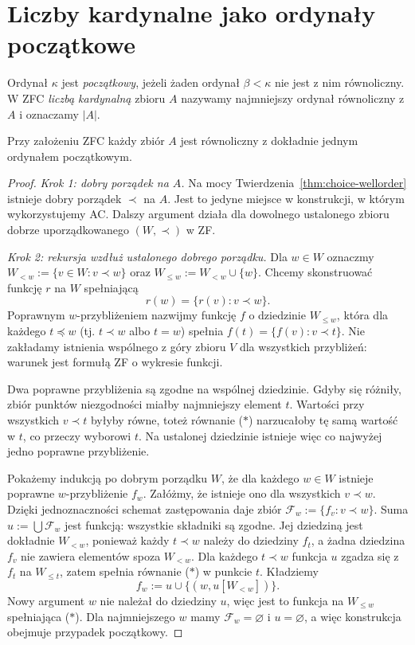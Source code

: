 \section{Liczby kardynalne jako ordynały początkowe}
\begin{definicja}\label{def:initial-ordinal}
Ordynał $\kappa$ jest \emph{początkowy}, jeżeli żaden ordynał $\beta<\kappa$ nie jest z nim równoliczny. W ZFC \emph{liczbą kardynalną} zbioru $A$ nazywamy najmniejszy ordynał równoliczny z $A$ i oznaczamy $|A|$.
\end{definicja}
\begin{twierdzenie}\label{thm:initial-exists}
Przy założeniu ZFC każdy zbiór $A$ jest równoliczny z dokładnie jednym ordynałem początkowym.
\end{twierdzenie}
\begin{proof}
\emph{Krok 1: dobry porządek na $A$.}
Na mocy Twierdzenia~\ref{thm:choice-wellorder}
istnieje dobry porządek $\prec$ na $A$.
Jest to jedyne miejsce w konstrukcji,
w którym wykorzystujemy AC.
Dalszy argument działa dla dowolnego ustalonego
zbioru dobrze uporządkowanego $(W,\prec)$ w ZF.

\emph{Krok 2: rekursja wzdłuż ustalonego dobrego porządku.}
Dla $w\in W$ oznaczmy
$W_{<w}:=\{v\in W:v\prec w\}$ oraz
$W_{\le w}:=W_{<w}\cup\{w\}$.
Chcemy skonstruować funkcję $r$ na $W$
spełniającą
\[
r(w)=\{r(v):v\prec w\}.
\tag{$*$}
\]
Poprawnym $w$-przybliżeniem nazwijmy funkcję
$f$ o dziedzinie $W_{\le w}$,
która dla każdego $t\preceq w$
(tj. $t\prec w$ albo $t=w$) spełnia
$f(t)=\{f(v):v\prec t\}$.
Nie zakładamy istnienia wspólnego z góry
zbioru $V$ dla wszystkich przybliżeń:
warunek jest formułą ZF o wykresie funkcji.

Dwa poprawne przybliżenia są zgodne
na wspólnej dziedzinie.
Gdyby się różniły, zbiór punktów niezgodności
miałby najmniejszy element $t$.
Wartości przy wszystkich $v\prec t$
byłyby równe, toteż równanie ($*$)
narzucałoby tę samą wartość w $t$,
co przeczy wyborowi $t$.
Na ustalonej dziedzinie istnieje więc
co najwyżej jedno poprawne przybliżenie.

Pokażemy indukcją po dobrym porządku $W$,
że dla każdego $w\in W$ istnieje
poprawne $w$-przybliżenie $f_w$.
Załóżmy, że istnieje ono dla wszystkich $v\prec w$.
Dzięki jednoznaczności schemat zastępowania
daje zbiór
$\mathcal F_w:=\{f_v:v\prec w\}$.
Suma $u:=\bigcup\mathcal F_w$ jest funkcją:
wszystkie składniki są zgodne.
Jej dziedziną jest dokładnie $W_{<w}$,
ponieważ każdy $t\prec w$ należy do
dziedziny $f_t$, a żadna dziedzina
$f_v$ nie zawiera elementów spoza $W_{<w}$.
Dla każdego $t\prec w$ funkcja $u$
zgadza się z $f_t$ na $W_{\le t}$,
zatem spełnia równanie ($*$) w punkcie $t$.
Kładziemy
\[
f_w:=u\cup\{(w,u[W_{<w}])\}.
\]
Nowy argument $w$ nie należał do
dziedziny $u$, więc jest to funkcja
na $W_{\le w}$ spełniająca ($*$).
Dla najmniejszego $w$ mamy
$\mathcal F_w=\varnothing$ i $u=\varnothing$,
a więc konstrukcja obejmuje przypadek początkowy.


\end{proof}
